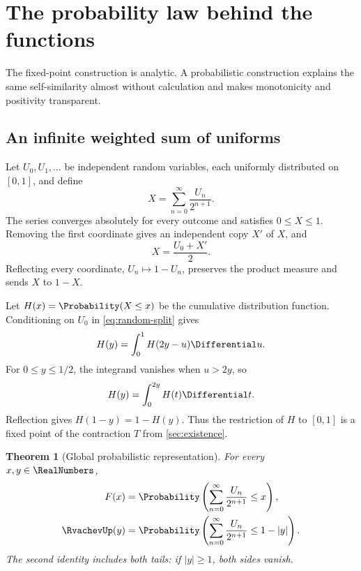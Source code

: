 \documentclass[11pt,oneside]{article}
\newtheorem{theorem}{Theorem}[section]
\theoremstyle{definition}
\theoremstyle{remark}
\begin{document}
\section{The probability law behind the functions}
\label{sec:probability}

The fixed-point construction is analytic.  A probabilistic construction explains the same
self-similarity almost without calculation and makes monotonicity and positivity transparent.

\subsection{An infinite weighted sum of uniforms}

Let $U_0,U_1,\ldots$ be independent random variables, each uniformly distributed on
$[0,1]$, and define
\begin{equation}
 X=\sum_{n=0}^{\infty}\frac{U_n}{2^{n+1}}.                \label{eq:random-X}
\end{equation}
The series converges absolutely for every outcome and satisfies $0\le X\le1$.  Removing the
first coordinate gives an independent copy $X'$ of $X$, and
\begin{equation}
 X=\frac{U_0+X'}2.                                         \label{eq:random-split}
\end{equation}
Reflecting every coordinate, $U_n\mapsto1-U_n$, preserves the product measure and sends
$X$ to $1-X$.

Let $H(x)=\Probability(X\le x)$ be the cumulative distribution function.  Conditioning on $U_0$
in \eqref{eq:random-split} gives
\begin{equation}
 H(y)=\int_0^1 H(2y-u)\Differential u.                               \label{eq:CDF-smoothing}
\end{equation}
For $0\le y\le1/2$, the integrand vanishes when $u>2y$, so
\begin{equation}
 H(y)=\int_0^{2y}H(t)\Differential t.                                \label{eq:CDF-left}
\end{equation}
Reflection gives $H(1-y)=1-H(y)$.  Thus the restriction of $H$ to $[0,1]$ is a fixed point
of the contraction $T$ from \cref{sec:existence}.

\begin{theorem}[Global probabilistic representation]
\label{thm:probability-representation-global}
For every \(x,y\in\RealNumbers\),
\begin{align}
 F(x)
 &=\Probability\left(\sum_{n=0}^{\infty}\frac{U_n}{2^{n+1}}\le x\right),
                                                               \label{eq:F-CDF}\\
 \RvachevUp(y)
 &=\Probability\left(\sum_{n=0}^{\infty}\frac{U_n}{2^{n+1}}\le1-|y|\right).
                                                               \label{eq:up-CDF-global}
\end{align}
The second identity includes both tails: if \(|y|\ge1\), both sides vanish.
\end{theorem}
\end{document}
